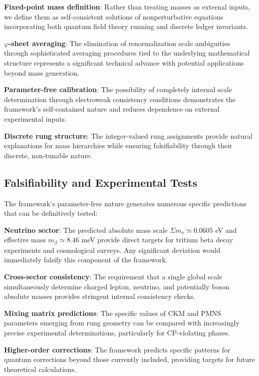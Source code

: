 \documentclass[%
amsmath,amssymb,
aps,
prb,
floatfix,
twocolumn
]{revtex4-2}
\begin{document}
\textbf{Fixed-point mass definition}: Rather than treating masses as external inputs, we define them as self-consistent solutions of nonperturbative equations incorporating both quantum field theory running and discrete ledger invariants.

\textbf{$\varphi$-sheet averaging}: The elimination of renormalization scale ambiguities through sophisticated averaging procedures tied to the underlying mathematical structure represents a significant technical advance with potential applications beyond mass generation.

\textbf{Parameter-free calibration}: The possibility of completely internal scale determination through electroweak consistency conditions demonstrates the framework's self-contained nature and reduces dependence on external experimental inputs.

\textbf{Discrete rung structure}: The integer-valued rung assignments provide natural explanations for mass hierarchies while ensuring falsifiability through their discrete, non-tunable nature.

\subsection{Falsifiability and Experimental Tests}

The framework's parameter-free nature generates numerous specific predictions that can be definitively tested:

\textbf{Neutrino sector}: The predicted absolute mass scale $\Sigma m_\nu \simeq 0.0605$ eV and effective mass $m_\beta \simeq 8.46$ meV provide direct targets for tritium beta decay experiments and cosmological surveys. Any significant deviation would immediately falsify this component of the framework.

\textbf{Cross-sector consistency}: The requirement that a single global scale simultaneously determine charged lepton, neutrino, and potentially boson absolute masses provides stringent internal consistency checks.

\textbf{Mixing matrix predictions}: The specific values of CKM and PMNS parameters emerging from rung geometry can be compared with increasingly precise experimental determinations, particularly for CP-violating phases.

\textbf{Higher-order corrections}: The framework predicts specific patterns for quantum corrections beyond those currently included, providing targets for future theoretical calculations.
\end{document}
